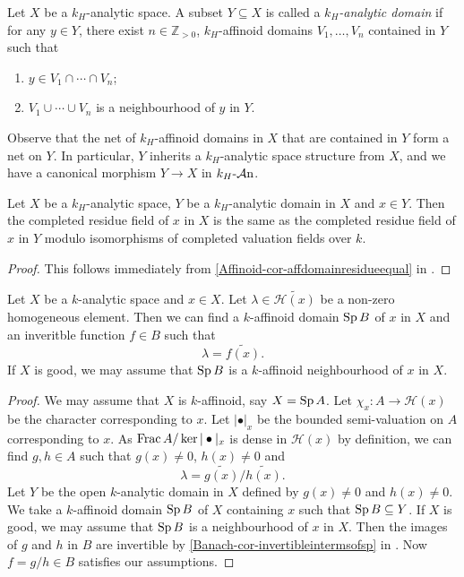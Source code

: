 \begin{definition}\label{def-khanalyticdomain}
    Let $X$ be a $k_H$-analytic space. A subset $Y\subseteq X$ is called a \emph{$k_H$-analytic domain} if for any $y\in Y$, there exist $n\in \mathbb{Z}_{>0}$, $k_H$-affinoid domains $V_1,\ldots,V_n$ contained in $Y$ such that
    \begin{enumerate}
        \item $y\in V_1\cap \cdots\cap V_n$;
        \item $V_1\cup\cdots\cup V_n$ is a neighbourhood of $y$ in $Y$.
    \end{enumerate}
\end{definition}
Observe that the net of $k_H$-affinoid domains in $X$ that are contained in $Y$ form a net on $Y$. In particular, $Y$ inherits a $k_H$-analytic space structure from $X$, and we have a canonical morphism $Y\rightarrow X$ in $k_H\text{-}\mathcal{A}\mathrm{n}$.

\begin{lemma}
    Let $X$ be a $k_H$-analytic space, $Y$ be a $k_H$-analytic domain in $X$ and $x\in Y$. Then the completed residue field of $x$ in $X$ is the same as the completed residue field of $x$ in $Y$ modulo isomorphisms of completed valuation fields over $k$.
\end{lemma}
\begin{proof}
    This follows immediately from \cref{Affinoid-cor-affdomainresidueequal} in .
\end{proof}

\begin{proposition}\label{prop-liftelementsinHxred}
    Let $X$ be a $k$-analytic space and $x\in X$. Let $\lambda\in \widetilde{\mathscr{H}(x)}$ be a non-zero homogeneous element. Then we can find a $k$-affinoid domain $\operatorname{Sp} B$ of $x$ in $X$ and an inveritble function $f\in B$ such that 
    \[
        \lambda=\widetilde{f(x)}.  
    \]
    If $X$ is good, we may assume that $\operatorname{Sp} B$ is a $k$-affinoid neighbourhood of $x$ in $X$.
\end{proposition}
\begin{proof}
    We may assume that $X$ is $k$-affinoid, say $X=\operatorname{Sp} A$. Let $\chi_x:A\rightarrow \mathscr{H}(x)$ be the character corresponding to $x$. Let $|\bullet|_x$ be the bounded semi-valuation on $A$ corresponding to $x$.
    As $\operatorname{Frac} A/\ker|\bullet|_x$ is dense in $\mathscr{H}(x)$ by definition, we can find $g,h\in A$ such that $g(x)\neq 0$, $h(x)\neq 0$ and
    \[
        \lambda=\widetilde{g(x)}/\widetilde{h(x)}.  
    \]
    Let $Y$ be the open $k$-analytic domain in $X$ defined by $g(x)\neq 0$ and $h(x)\neq 0$. We take a $k$-affinoid domain $\operatorname{Sp} B$ of $X$ containing $x$ such that $\operatorname{Sp} B\subseteq Y$. If $X$ is good, we may assume that $\operatorname{Sp} B$ is a neighbourhood of $x$ in $X$. Then the images of $g$ and $h$ in $B$ are invertible by \cref{Banach-cor-invertibleintermsofsp} in . Now $f=g/h\in B$ satisfies our assumptions. 
\end{proof}


